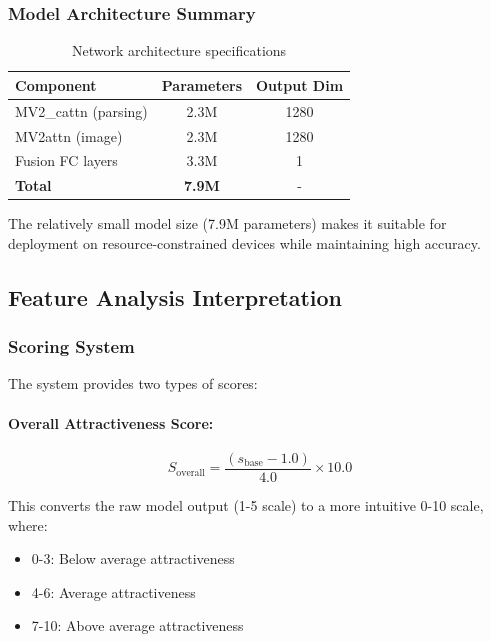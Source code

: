 \subsubsection{Model Architecture Summary}

\begin{table}[h]
\centering
\caption{Network architecture specifications}
\begin{tabular}{lcc}
\hline
\textbf{Component} & \textbf{Parameters} & \textbf{Output Dim} \\
\hline
MV2\_cattn (parsing) & 2.3M & 1280 \\
MV2attn (image) & 2.3M & 1280 \\
Fusion FC layers & 3.3M & 1 \\
\hline
\textbf{Total} & \textbf{7.9M} & - \\
\hline
\end{tabular}
\end{table}

The relatively small model size (7.9M parameters) makes it suitable for deployment on resource-constrained devices while maintaining high accuracy.

\subsection{Feature Analysis Interpretation}

\subsubsection{Scoring System}

The system provides two types of scores:

\paragraph{Overall Attractiveness Score:}
\begin{equation}
S_{\text{overall}} = \frac{(s_{\text{base}} - 1.0)}{4.0} \times 10.0
\end{equation}

This converts the raw model output (1-5 scale) to a more intuitive 0-10 scale, where:
\begin{itemize}
    \item 0-3: Below average attractiveness
    \item 4-6: Average attractiveness
    \item 7-10: Above average attractiveness
\end{itemize}

